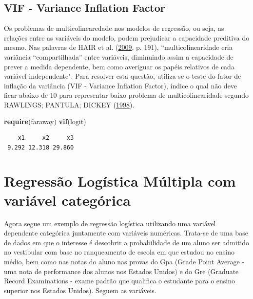 \documentclass[12pt,brazil,oneside]{book}
\newenvironment{Shaded}{\begin{snugshade}}{\end{snugshade}}
\newcommand{\KeywordTok}[1]{\textcolor[rgb]{0.13,0.29,0.53}{\textbf{#1}}}
\newcommand{\NormalTok}[1]{#1}
\begin{document}
\hypertarget{vif---variance-inflation-factor}{%
\subsection{VIF - Variance Inflation Factor}\label{vif---variance-inflation-factor}}

Os problemas de multicolinearedade nos modelos de regressão, ou seja, as relações entre as variáveis do modelo, podem prejudicar a capacidade preditiva do mesmo. Nas palavras de HAIR et al. (\protect\hyperlink{ref-Hair2009}{2009}, p. 191), ``multicolinearidade cria variância ``compartilhada'' entre variáveis, diminuindo assim a capacidade de prever a medida dependente, bem como averiguar os papéis relativos de cada variável independente".
Para resolver esta questão, utiliza-se o teste do fator de inflação da variância (VIF - Variance Inflation Factor), índice o qual não deve ficar abaixo de 10 para representar baixo problema de multicolinearidade segundo RAWLINGS; PANTULA; DICKEY (\protect\hyperlink{ref-Rawlings1998}{1998}).

\begin{Shaded}
\begin{Highlighting}[]
\KeywordTok{require}\NormalTok{(faraway)}
\KeywordTok{vif}\NormalTok{(logit)}
\end{Highlighting}
\end{Shaded}

\begin{verbatim}
    x1     x2     x3 
 9.292 12.318 29.860 
\end{verbatim}

\hypertarget{regressao-logistica-multipla-com-variavel-categorica}{%
\section{Regressão Logística Múltipla com variável categórica}\label{regressao-logistica-multipla-com-variavel-categorica}}

Agora segue um exemplo de regressão logística utilizando uma variável dependente categórica juntamente com variáveis numéricas. Trata-se de uma base de dados em que o interesse é descobrir a probabilidade de um aluno ser admitido no vestibular com base no ranqueamento de escola em que estudou no ensino médio, bem como nas notas do aluno nas provas do Gpa (Grade Point Average - uma nota de performance dos alunos nos Estados Unidos) e do Gre (Graduate Record Examinations - exame padrão que qualifica o estudante para o ensino superior nos Estados Unidos). Seguem as variáveis.
\end{document}
